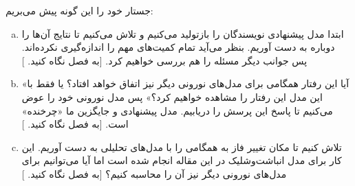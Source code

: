 
جستار خود را این گونه پیش می‌بریم:
\begin{enumerate}[(a)]
	\item
	ابتدا مدل پیشنهادی نویسندگان \cite{PhysRevLett.105.158104} را بازتولید می‌کنیم و تلاش می‌کنیم تا نتایج آن‌ها را دوباره به دست آوریم. بنظر می‌آید تمام کمیت‌های مهم را اندازه‌گیری نکرده‌اند. پس جوانب دیگر مسئله را هم بررسی خواهیم کرد. [به فصل 
	نگاه کنید.
	]
	\item 
	«آیا این رفتار همگامی برای مدل‌های نورونی دیگر نیز اتفاق خواهد افتاد؟ یا فقط با این مدل این رفتار را مشاهده خواهیم کرد؟» پس مدل نورونی خود را عوض می‌کنیم تا پاسخ این پرسش را دریابیم. مدل پیشنهادی و جایگزین ما «چرخنده» است. [به فصل 
	نگاه کنید.
	]
	\item 
	تلاش کنیم تا مکان تغییر فاز به همگامی را با مدل‌های تحلیلی به دست آوریم. این کار برای مدل انباشت‌وشلیک در این مقاله 
	\cite{brunel2000dynamics}
	انجام شده است اما آیا می‌توانیم برای مدل‌های نورونی دیگر نیز آن را محاسبه کنیم؟ [به فصل 
	نگاه کنید.
	]
\end{enumerate}
